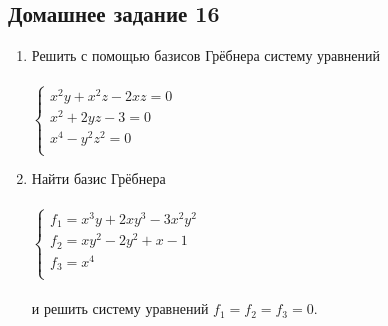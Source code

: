\subsection{Домашнее задание 16}\begin{enumerate}
    \item Решить с помощью базисов Грёбнера систему уравнений\\ \\
    $
    \left\{
    \begin{array}{lcl}
    x^2y+x^2z-2xz=0\\
    x^2+2yz-3=0\\
    x^4-y^2z^2=0\\
    \end{array}
    \right.
    $
    \item Найти базис Грёбнера\\ \\
    $
    \left\{
    \begin{array}{lcl}
    f_1=x^3y+2xy^3-3x^2y^2\\
    f_2=xy^2-2y^2+x-1\\
    f_3=x^4\\
    \end{array}
    \right.
    $
    \\ \\и решить систему уравнений $f_1=f_2=f_3=0$.
\end{enumerate}